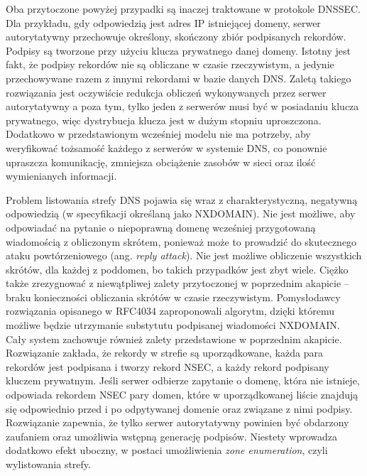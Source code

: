 Oba przytoczone powyżej przypadki są inaczej traktowane w protokole DNSSEC. Dla przykładu, gdy odpowiedzią jest
adres IP istniejącej domeny, serwer autorytatywny przechowuje określony, skończony zbiór podpisanych rekordów. Podpisy są tworzone
przy użyciu klucza prywatnego danej domeny. Istotny jest fakt, że podpisy rekordów nie są obliczane w czasie rzeczywistym, a jedynie
przechowywane razem z innymi rekordami w bazie danych DNS. Zaletą takiego rozwiązania jest oczywiście redukcja obliczeń wykonywanych
przez serwer autorytatywny a poza tym, tylko jeden z serwerów musi być w posiadaniu klucza prywatnego, więc dystrybucja klucza jest w
dużym stopniu uproszczona. Dodatkowo w przedstawionym wcześniej modelu nie ma potrzeby, aby weryfikować tożsamość każdego z serwerów
w systemie DNS, co ponownie upraszcza komunikację, zmniejsza obciążenie zasobów w sieci oraz ilość wymienianych informacji.

Problem listowania strefy DNS pojawia się wraz z charakterystyczną, negatywną odpowiedzią (w specyfikacji określaną jako NXDOMAIN).
Nie jest możliwe, aby odpowiadać na pytanie o niepoprawną domenę wcześniej przygotowaną wiadomością z obliczonym skrótem, ponieważ
może to prowadzić do skutecznego ataku powtórzeniowego (ang. \textit{reply attack}). Nie jest możliwe obliczenie wszystkich skrótów,
dla każdej z poddomen, bo takich przypadków jest zbyt wiele. Ciężko także zrezygnować z niewątpliwej zalety przytoczonej w poprzednim
akapicie -- braku konieczności obliczania skrótów w czasie rzeczywistym. Pomysłodawcy rozwiązania opisanego w RFC4034 \cite{RFC4034}
zaproponowali algorytm, dzięki któremu możliwe będzie utrzymanie substytutu podpisanej wiadomości NXDOMAIN. Cały system zachowuje
również zalety przedstawione w poprzednim akapicie. Rozwiązanie zakłada, że rekordy w strefie są uporządkowane, każda para rekordów
jest podpisana i tworzy rekord NSEC, a każdy rekord podpisany kluczem prywatnym. Jeśli serwer odbierze zapytanie o domenę, która
nie istnieje, odpowiada rekordem NSEC pary domen, które w uporządkowanej liście znajdują się odpowiednio przed i po odpytywanej
domenie oraz związane z nimi podpisy. Rozwiązanie zapewnia, że tylko serwer autorytatywny powinien być obdarzony zaufaniem oraz
umożliwia wstępną generację podpisów. Niestety wprowadza dodatkowo efekt uboczny, w postaci umożliwienia \textit{zone enumeration},
czyli wylistowania strefy.

